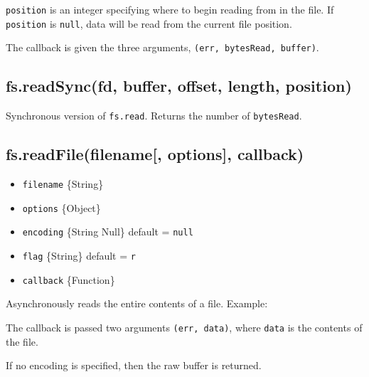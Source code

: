 \texttt{position} is an integer specifying where to begin reading from
in the file. If \texttt{position} is \texttt{null}, data will be read
from the current file position.

The callback is given the three arguments,
\texttt{(err,\ bytesRead,\ buffer)}.

\subsection{fs.readSync(fd, buffer, offset, length,
position)}\label{fs.readsyncfd-buffer-offset-length-position}

Synchronous version of \texttt{fs.read}. Returns the number of
\texttt{bytesRead}.

\subsection{fs.readFile(filename{[}, options{]},
callback)}\label{fs.readfilefilename-options-callback}

\begin{itemize}
\itemsep1pt\parskip0pt
\item
  \texttt{filename} \{String\}
\item
  \texttt{options} \{Object\}
\item
  \texttt{encoding} \{String \textbar{} Null\} default = \texttt{null}
\item
  \texttt{flag} \{String\} default =
  \texttt{\textquotesingle{}r\textquotesingle{}}
\item
  \texttt{callback} \{Function\}
\end{itemize}

Asynchronously reads the entire contents of a file. Example:

\begin{Shaded}
\begin{Highlighting}[]
\NormalTok{(}\NormalTok{, } 
    
\NormalTok{\});}
\end{Highlighting}
\end{Shaded}

The callback is passed two arguments \texttt{(err,\ data)}, where
\texttt{data} is the contents of the file.

If no encoding is specified, then the raw buffer is returned.

